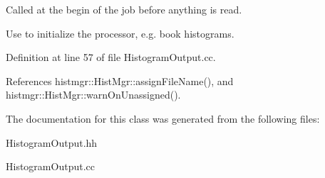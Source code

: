 Called at the begin of the job before anything is read. 

Use to initialize the processor, e.\-g. book histograms. 

Definition at line 57 of file Histogram\-Output.\-cc.



References histmgr\-::\-Hist\-Mgr\-::assign\-File\-Name(), and histmgr\-::\-Hist\-Mgr\-::warn\-On\-Unassigned().



The documentation for this class was generated from the following files\-:\begin{DoxyCompactItemize}
\item 
Histogram\-Output.\-hh\item 
Histogram\-Output.\-cc\end{DoxyCompactItemize}
